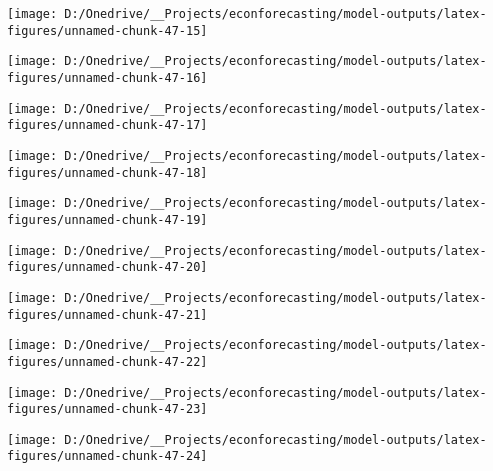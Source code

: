 \documentclass[11pt, letterpaper]{article}\usepackage[]{graphicx}\usepackage[]{color}
\begin{document}
{\centering \texttt{[image: D:/Onedrive/\_\_Projects/econforecasting/model-outputs/latex-figures/unnamed-chunk-47-15]} 

}




{\centering \texttt{[image: D:/Onedrive/\_\_Projects/econforecasting/model-outputs/latex-figures/unnamed-chunk-47-16]} 

}




{\centering \texttt{[image: D:/Onedrive/\_\_Projects/econforecasting/model-outputs/latex-figures/unnamed-chunk-47-17]} 

}




{\centering \texttt{[image: D:/Onedrive/\_\_Projects/econforecasting/model-outputs/latex-figures/unnamed-chunk-47-18]} 

}




{\centering \texttt{[image: D:/Onedrive/\_\_Projects/econforecasting/model-outputs/latex-figures/unnamed-chunk-47-19]} 

}




{\centering \texttt{[image: D:/Onedrive/\_\_Projects/econforecasting/model-outputs/latex-figures/unnamed-chunk-47-20]} 

}




{\centering \texttt{[image: D:/Onedrive/\_\_Projects/econforecasting/model-outputs/latex-figures/unnamed-chunk-47-21]} 

}




{\centering \texttt{[image: D:/Onedrive/\_\_Projects/econforecasting/model-outputs/latex-figures/unnamed-chunk-47-22]} 

}




{\centering \texttt{[image: D:/Onedrive/\_\_Projects/econforecasting/model-outputs/latex-figures/unnamed-chunk-47-23]} 

}




{\centering \texttt{[image: D:/Onedrive/\_\_Projects/econforecasting/model-outputs/latex-figures/unnamed-chunk-47-24]} 

}
\end{document}
